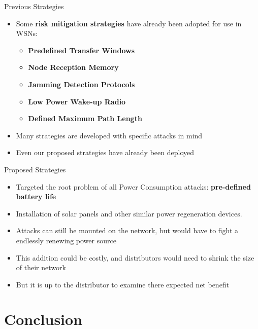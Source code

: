 \documentclass{beamer}
\begin{document}
\begin{frame}{Previous Strategies}

\begin{itemize}

	\item Some \textbf{risk mitigation strategies} have already been adopted for use in WSNs:
	\begin{itemize}
		\item \textbf{Predefined Transfer Windows}
		\item \textbf{Node Reception Memory}
		\item \textbf{Jamming Detection Protocols}
		\item \textbf{Low Power Wake-up Radio}
		\item \textbf{Defined Maximum Path Length}
	\end{itemize}
	\item Many strategies are developed with specific attacks in mind
	\item Even our proposed strategies have already been deployed
	
\end{itemize}

\end{frame}

\begin{frame}{Proposed Strategies}

\begin{itemize}

	\item Targeted the root problem of all Power Consumption attacks: \textbf{pre-defined battery life}
	\item Installation of solar panels and other similar power regeneration devices.
	\item Attacks can still be mounted on the network, but would have to fight a endlessly renewing power source 
	\item This addition could be costly, and distributors would need to shrink the size of their network
	\item But it is up to the distributor to examine there expected net benefit
	
\end{itemize}

\end{frame}

\section{Conclusion}
\end{document}
